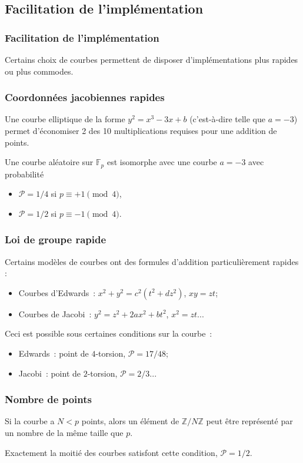 \documentclass[francais]{beamer}
\newcommand{\prob}{\mathcal{P}}
\begin{document}
\subsection{Facilitation de l'implémentation}

\begin{frame}\frametitle{Facilitation de l'implémentation}
Certains choix de courbes permettent de disposer d'implémentations
plus rapides ou plus commodes.
\end{frame}

\begin{frame}\frametitle{Coordonnées jacobiennes rapides}
Une courbe elliptique de la forme $y^2 = x^3 - 3 x + b$
(c'est-à-dire telle que $a=-3$)
permet d'économiser 2 des 10 multiplications requises
pour une addition de points.

\bigskip
Une courbe aléatoire sur $\mathbb F_p$ est isomorphe avec une courbe
$a=-3$ avec probabilité
\begin{itemize}
\item $\prob = 1/4$ si $p ≡ +1 \pmod{4}$,
\item $\prob = 1/2$ si $p ≡ -1 \pmod{4}$.
\end{itemize}
\end{frame}


\begin{frame}\frametitle{Loi de groupe rapide}

Certains modèles de courbes ont des formules d'addition particulièrement rapides :
\begin{itemize}
\item Courbes d'Edwards : $x^2 + y^2 = c^2 (t^2 + d z^2)$, $xy = zt$;
\item Courbes de Jacobi : $y^2 = z^2 + 2 a x^2 + b t^2$, $x^2 = zt$...
\end{itemize}
\bigskip
Ceci est possible sous certaines conditions sur la courbe :
\begin{itemize}
\item Edwards : point de $4$-torsion, $\prob = 17/48$;
\item Jacobi : point de $2$-torsion, $\prob = 2/3$...
\end{itemize}
\end{frame}

\begin{frame}\frametitle{Nombre de points}
Si la courbe a $N < p$ points,
alors un élément de $ℤ/Nℤ$ peut être représenté par un nombre
de la même taille que $p$.

\bigskip
Exactement la moitié des courbes satisfont cette condition, $\prob = 1/2$.
\end{frame}
\end{document}
